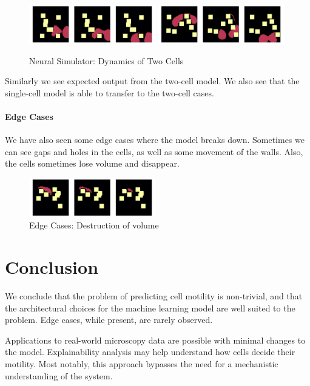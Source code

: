 \documentclass[a4paper,10pt,twocolumn]{article}
\begin{document}
            \begin{figure}[H]\centering
                \includegraphics[width=0.49\textwidth]{../images/run_22.png}
                \includegraphics[width=0.49\textwidth]{../images/run_12.png}
                \caption{Neural Simulator: Dynamics of Two Cells}
            \end{figure}
            Similarly we see expected output from the two-cell model. We also see that the
            single-cell model is able to transfer to the two-cell cases.
            
            \paragraph{Edge Cases}
            We have also seen some edge cases where the model breaks down.
            Sometimes we can see gaps and holes in the cells, as well as some movement of the walls.
            Also, the cells sometimes lose volume and disappear.
            \begin{figure}[H]\centering
                \includegraphics[width=0.49\textwidth]{../images/run_5.png}
                \caption{Edge Cases: Destruction of volume}
            \end{figure}

    \section{Conclusion}
        We conclude that the problem of predicting cell motility is non-trivial, and that
        the architectural choices for the machine learning model are well suited to the problem.
        Edge cases, while present, are rarely observed.

        Applications to real-world microscopy data are possible with minimal changes to the model.
        Explainability analysis may help understand how cells decide their motility.
        Most notably, this approach bypasses the need for a mechanistic understanding of the system.
\end{document}
